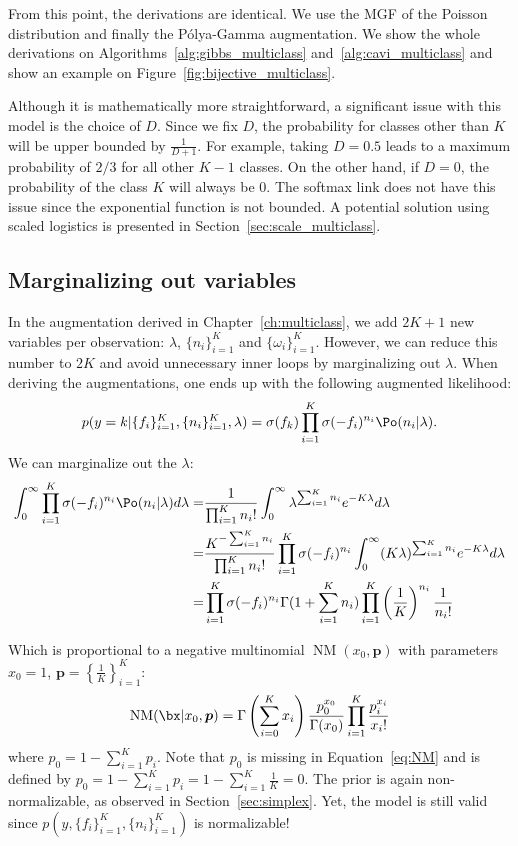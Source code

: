 From this point, the derivations are identical.
We use the \ac{MGF} of the Poisson distribution and finally the P\'olya-Gamma augmentation.
We show the whole derivations on Algorithms~\ref{alg:gibbs_multiclass} and~\ref{alg:cavi_multiclass} and show an example on Figure~\ref{fig:bijective_multiclass}.

Although it is mathematically more straightforward, a significant issue with this model is the choice of $D$.
Since we fix $D$, the probability for classes other than $K$ will be upper bounded by $\frac{1}{D + 1}$.
For example, taking $D=0.5$ leads to a maximum probability of $2/3$ for all other $K-1$ classes.
On the other hand, if $D=0$, the probability of the class $K$ will always be $0$.
The softmax link does not have this issue since the exponential function is not bounded.
A potential solution using scaled logistics is presented in Section~\ref{sec:scale_multiclass}.

\subsection{Marginalizing out variables}
\label{sec:marg_multiclass}
In the augmentation derived in Chapter~\ref{ch:multiclass}, we add $2K + 1$ new variables per observation: $\lambda$, $\{n_i\}_{i=1}^K$ and $\{\omega_i\}_{i=1}^K$.
However, we can reduce this number to $2K$ and avoid unnecessary inner loops by marginalizing out $\lambda$.
When deriving the augmentations, one ends up with the following augmented likelihood:
\begin{align}
    p(y=k|\{f_i\}_{i=1}^K,\{n_i\}_{i=1}^K,\lambda) = \sigma(f_k) \prod_{i=1}^K \sigma(-f_i)^{n_i} \Po (n_i|\lambda).
\end{align}
We can marginalize out the $\lambda$:
\begin{align}
    \int_{0}^\infty \prod_{i=1}^K \sigma(-f_i)^{n_i} \Po (n_i|\lambda)d\lambda =& \frac{1}{\prod_{i=1}^K n_i!}\int_{0}^\infty \lambda^{\sum_{i=1}^K n_i}e^{-K\lambda}d\lambda \nonumber\\
    =& \frac{K^{-\sum_{i=1}^K n_i}}{\prod_{i=1}^K n_i!}\prod_{i=1}^K \sigma(-f_i)^{n_i} \int_{0}^\infty (K\lambda)^{\sum_{i=1}^K n_i}e^{-K\lambda}d\lambda \nonumber\\
    =& \prod_{i=1}^K\sigma(-f_i)^{n_i}\Gamma(1 + \sum_{i=1}^K n_i) \prod_{i=1}^K \left(\frac{1}{K}\right)^{n_i}\frac{1}{n_i!} \label{eq:NM}
\end{align}

Which is proportional to a negative multinomial $\operatorname{NM}(x_0, \boldsymbol{p})$ with parameters $x_0=1$, $\boldsymbol{p}=\left\{\frac{1}{K}\right\}_{i=1}^K$:
\begin{align*}
    \operatorname{NM}(\bx|x_0,\boldsymbol{p}) = \Gamma\left(\sum_{i=0}^K x_i\right) \frac{p_0^{x_0}}{\Gamma(x_0)}\prod_{i=1}^K \frac{p_i^{x_i}}{x_i!}   
\end{align*}
where $p_0 = 1 - \sum_{i=1}^K p_i$.
Note that $p_0$ is missing in Equation~\eqref{eq:NM} and is defined by $p_0= 1 - \sum_{i=1}^K p_i = 1 - \sum_{i=1}^{K}\frac{1}{K} = 0$.
The prior is again non-normalizable, as observed in Section~\ref{sec:simplex}.
Yet, the model is still valid since $p(y,\{f_i\}_{i=1}^K,\{n_i\}_{i=1}^K)$ is normalizable!

